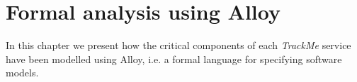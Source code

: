 \chapter{Formal analysis using Alloy}

    In this chapter we present how the critical components of each \emph{TrackMe} service have been modelled using Alloy, i.e. a formal language for specifying software models.
    
    
    
    
    